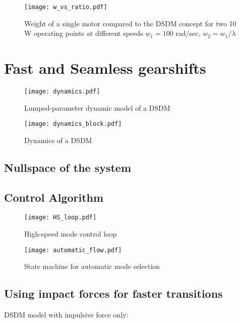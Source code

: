 \begin{figure}[H]
	\centering
		\texttt{[image: w\_vs\_ratio.pdf]}
	\caption{Weight of a single motor compared to the DSDM concept for two 10 W operating points at different speeds $w_1=100$ rad/sec, $w_2 = w_1 / \lambda$}
	\label{fig:1vs2}
\end{figure}


\section{Fast and Seamless gearshifts}
\label{sec:FastAndSeamlessGearshifts}

\begin{figure}[H]
	\centering
		\texttt{[image: dynamics.pdf]}
	\caption{Lumped-parameter dynamic model of a DSDM}
	\label{fig:dynamics}
\end{figure}

\begin{figure}[H]
	\centering
		\texttt{[image: dynamics\_block.pdf]}
	\caption{Dynamics of a DSDM}
	\label{fig:dynamics_block}
\end{figure}

\subsection{Nullspace of the system}

\subsection{Control Algorithm}


\begin{figure}[H]
	\centering
		\texttt{[image: HS\_loop.pdf]}
	\caption{High-speed mode control loop}
	\label{fig:HS_loop}
\end{figure}

\begin{figure}[H]
	\centering
		\texttt{[image: automatic\_flow.pdf]}
	\caption{State machine for automatic mode selection}
	\label{fig:automaticflow}
\end{figure}


\subsection{Using impact forces for faster transitions}

DSDM model with impulsive force only:


